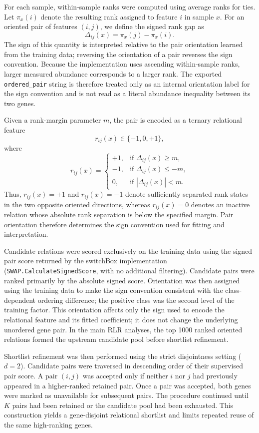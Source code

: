 \documentclass[journal]{IEEEtran}
\begin{document}
For each sample, within-sample ranks were computed using average ranks for ties. Let $\pi_x(i)$ denote the resulting rank assigned to feature $i$ in sample $x$. For an oriented pair of features $(i,j)$, we define the signed rank gap as
\[
\Delta_{ij}(x)=\pi_x(j)-\pi_x(i).
\]
The sign of this quantity is interpreted relative to the pair orientation learned from the training data; reversing the orientation of a pair reverses the sign convention. Because the implementation uses ascending within-sample ranks, larger measured abundance corresponds to a larger rank. The exported \texttt{ordered\_pair} string is therefore treated only as an internal orientation label for the sign convention and is not read as a literal abundance inequality between its two genes.

Given a rank-margin parameter $m$, the pair is encoded as a ternary relational feature
\[
r_{ij}(x)\in\{-1,0,+1\},
\]
where
\[
r_{ij}(x)=
\begin{cases}
+1, & \text{if } \Delta_{ij}(x)\ge m,\\
-1, & \text{if } \Delta_{ij}(x)\le -m,\\
0, & \text{if } |\Delta_{ij}(x)|<m.
\end{cases}
\]
Thus, $r_{ij}(x)=+1$ and $r_{ij}(x)=-1$ denote sufficiently separated rank states in the two opposite oriented directions, whereas $r_{ij}(x)=0$ denotes an inactive relation whose absolute rank separation is below the specified margin. Pair orientation therefore determines the sign convention used for fitting and interpretation.

Candidate relations were scored exclusively on the training data using the signed pair score returned by the switchBox implementation (\texttt{SWAP.CalculateSignedScore}, with no additional filtering). Candidate pairs were ranked primarily by the absolute signed score. Orientation was then assigned using the training data to make the sign convention consistent with the class-dependent ordering difference; the positive class was the second level of the training factor. This orientation affects only the sign used to encode the relational feature and its fitted coefficient; it does not change the underlying unordered gene pair. In the main RLR analyses, the top 1000 ranked oriented relations formed the upstream candidate pool before shortlist refinement.

Shortlist refinement was then performed using the strict disjointness setting ($d=2$). Candidate pairs were traversed in descending order of their supervised pair score. A pair $(i,j)$ was accepted only if neither $i$ nor $j$ had previously appeared in a higher-ranked retained pair. Once a pair was accepted, both genes were marked as unavailable for subsequent pairs. The procedure continued until $K$ pairs had been retained or the candidate pool had been exhausted. This construction yields a gene-disjoint relational shortlist and limits repeated reuse of the same high-ranking genes.
\end{document}
